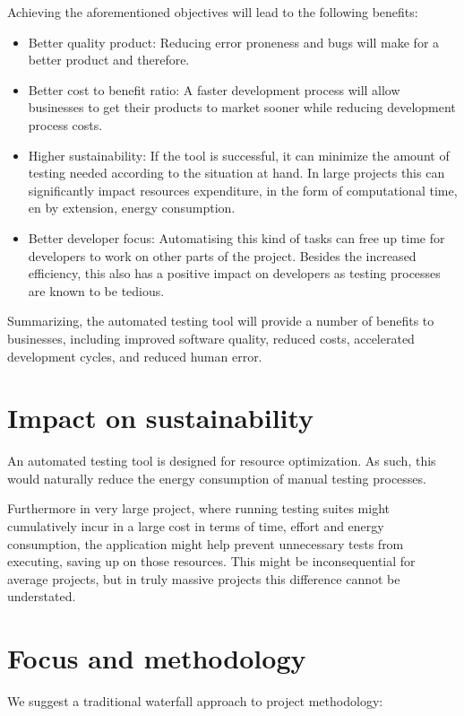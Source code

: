 \documentclass[a4paper, 11pt]{report}
\begin{document}
Achieving the aforementioned objectives will lead to the following benefits:
\begin{itemize}
    \item Better quality product: Reducing error proneness and bugs will make for a better product and therefore.
    \item Better cost to benefit ratio: A faster development process will allow businesses to get their products to market sooner while reducing development process costs.
    \item Higher sustainability: If the tool is successful, it can minimize the amount of testing needed according to the situation at hand. In large projects this can significantly impact resources expenditure, in the form of computational time, en by extension, energy consumption.
    \item Better developer focus: Automatising this kind of tasks can free up time for developers to work on other parts of the project. Besides the increased efficiency, this also has a positive impact on developers as testing processes are known to be tedious.
\end{itemize}

Summarizing, the automated testing tool will provide a number of benefits to businesses, including improved software quality, reduced costs, accelerated development cycles, and reduced human error.

\section{Impact on sustainability}
An automated testing tool is designed for resource optimization. As such, this would naturally reduce the energy consumption of manual testing processes.

Furthermore in very large project, where running testing suites might cumulatively incur in a large cost in terms of time, effort and energy consumption, the application might help prevent unnecessary tests from executing, saving up on those resources. This might be inconsequential for average projects, but in truly massive projects this difference cannot be understated.

\section{Focus and methodology} \label{Methodology}
We suggest a traditional waterfall approach to project methodology:
\end{document}

